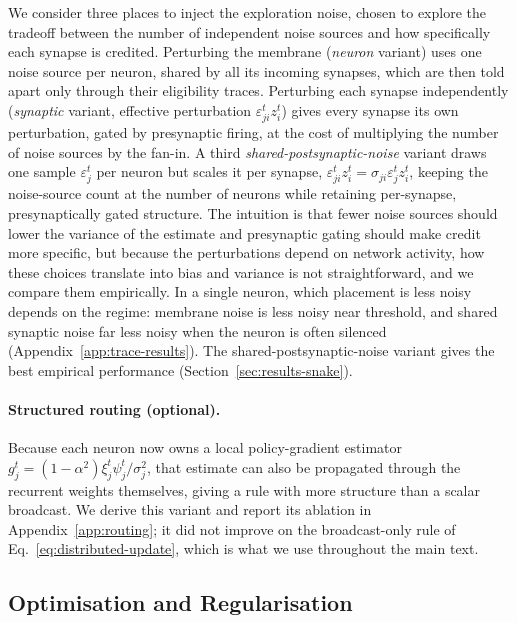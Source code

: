 \documentclass[10pt,twocolumn]{article}
\begin{document}
We consider three places to inject the exploration noise, chosen to explore
the tradeoff between the number of independent noise sources and how
specifically each synapse is credited. Perturbing the membrane (\emph{neuron}
variant) uses one noise source per neuron, shared by all its incoming
synapses, which are then told apart only through their eligibility traces.
Perturbing each synapse independently (\emph{synaptic} variant, effective
perturbation $\varepsilon^t_{ji}z^t_i$) gives every synapse its own
perturbation, gated by presynaptic firing, at the cost of multiplying the
number of noise sources by the fan-in. A third \emph{shared-postsynaptic-noise}
variant draws one sample $\varepsilon^t_j$ per neuron but scales it per synapse,
$\varepsilon^t_{ji}z^t_i = \sigma_{ji}\varepsilon^t_j z^t_i$, keeping the
noise-source count at the number of neurons while retaining per-synapse,
presynaptically gated structure. The intuition is that fewer noise sources
should lower the variance of the estimate and presynaptic gating should make
credit more specific, but because the perturbations depend on network activity,
how these choices translate into bias and variance is not straightforward, and
we compare them empirically. In a single neuron, which placement is less noisy
depends on the regime: membrane noise is less noisy near threshold, and shared
synaptic noise far less noisy when the neuron is often silenced
(Appendix~\ref{app:trace-results}). The shared-postsynaptic-noise variant gives the
best empirical performance (Section~\ref{sec:results-snake}).

\paragraph{Structured routing (optional).}
Because each neuron now owns a local policy-gradient estimator
$g^t_j=(1-\alpha^2)\xi^t_j\psi^t_j/\sigma_j^2$, that estimate can also be
propagated through the recurrent weights themselves, giving a rule with more
structure than a scalar broadcast. We derive this variant and report its
ablation in Appendix~\ref{app:routing}; it did not improve on the
broadcast-only rule of Eq.~\eqref{eq:distributed-update}, which is what we use
throughout the main text.

\subsection{Optimisation and Regularisation}
\label{sec:optimiser}
\end{document}
